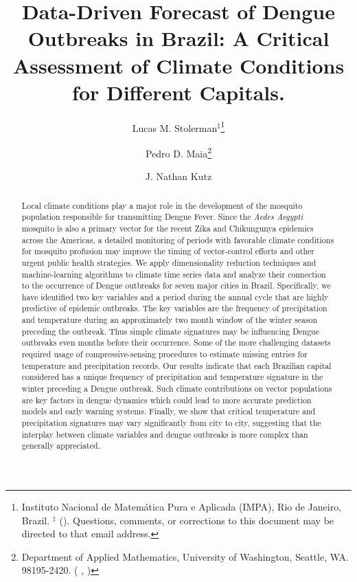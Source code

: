 \documentclass[final,leqno]{siamltexmm2}
\title{Data-Driven Forecast of Dengue Outbreaks in Brazil: A Critical Assessment of 
Climate Conditions for Different Capitals.}
\author{Lucas M. Stolerman$^\ddagger$\thanks{Instituto Nacional de Matem\'atica Pura e Aplicada (IMPA), Rio de Janeiro, Brazil.  $^\ddagger$ (\email{Lucasms@impa.br}). Questions, comments, or corrections to this document may be directed to that email address. }
 \and Pedro D. Maia\thanks{Department of Applied Mathematics, University of Washington, Seattle, WA. 98195-2420.  (\email{pmaia@uw.edu} , \email{kutz@uw.edu})
}
\and J. Nathan Kutz\samethanks[2] }
\begin{document}
\maketitle
\newcommand{\slugmaster}{%
\slugger{siads}{xxxx}{xx}{x}{ }}%


\begin{abstract}
Local climate conditions play a major role in the development of the mosquito 
population responsible for transmitting Dengue Fever. Since the {\em Aedes Aegypti} mosquito is also a primary vector for the recent Zika and Chikungunya epidemics across the Americas, a detailed
monitoring of periods with favorable climate conditions for mosquito profusion may improve 
the timing of vector-control efforts and other urgent public health strategies. 
We apply dimensionality reduction techniques and machine-learning algorithms to climate 
time series data and analyze their connection to the occurrence of Dengue outbreaks for seven major cities in Brazil. 
%
Specifically, we have identified two key variables and a period during the annual cycle that are highly predictive of
epidemic outbreaks.  The key variables are the frequency of precipitation and temperature during an approximately two month window of the winter season preceding the outbreak.  Thus simple climate signatures may be influencing Dengue outbreaks even months before their occurrence. 
%
Some of the more challenging datasets required usage of compressive-sensing procedures to estimate missing entries for temperature and precipitation records.  Our results indicate that each Brazilian capital considered has a unique frequency of precipitation and temperature signature in the winter preceding a Dengue outbreak.  Such climate contributions on vector populations are key factors 
in dengue dynamics which could lead to more accurate prediction models and early warning systems. 
Finally, we show that critical temperature and precipitation signatures may vary significantly from city to 
city, suggesting that the interplay between climate variables and dengue outbreaks is more complex than 
generally appreciated.
\end{abstract}
\end{document}
